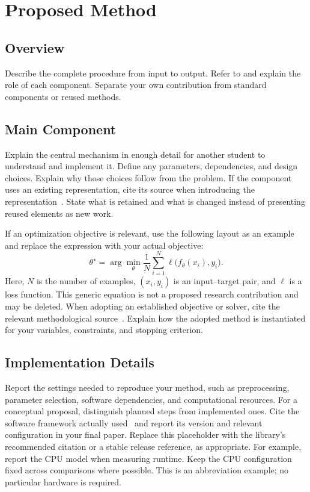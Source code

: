 \section{Proposed Method}
\label{sec:method}
\subsection{Overview}
Describe the complete procedure from input to output. Refer to
 and explain the role of each component.
Separate your own contribution from standard components or reused methods.

\subsection{Main Component}
Explain the central mechanism in enough detail for another student to
understand and implement it. Define any parameters, dependencies, and
design choices. Explain why those choices follow from the problem.
If the component uses an existing representation, cite its source when
introducing the representation~\cite{representation}. State what is retained
and what is changed instead of presenting reused elements as new work.

If an optimization objective is relevant, use the following layout as an
example and replace the expression with your actual objective:
\begin{equation}
  \theta^{\star}=\arg\min_{\theta}
  \frac{1}{N}\sum_{i=1}^{N}\ell\bigl(f_{\theta}(x_i),y_i\bigr).
  \label{eq:objective}
\end{equation}
Here, $N$ is the number of examples, $(x_i,y_i)$ is an input--target pair,
and $\ell$ is a loss function. This generic equation is not a proposed
research contribution and may be deleted.
When adopting an established objective or solver, cite the relevant
methodological source~\cite{optimization}. Explain how the adopted method
is instantiated for your variables, constraints, and stopping criterion.

\subsection{Implementation Details}
Report the settings needed to reproduce your method, such as preprocessing,
parameter selection, software dependencies, and computational resources.
For a conceptual proposal, distinguish planned steps from implemented ones.
Cite the software framework actually used~\cite{software} and report its
version and relevant configuration in your final paper. Replace this
placeholder with the library's recommended citation or a stable release
reference, as appropriate.
For example, report the \ac{CPU} model when measuring runtime.
Keep the \ac{CPU} configuration fixed across comparisons where possible.
This is an abbreviation example; no particular hardware is required.

